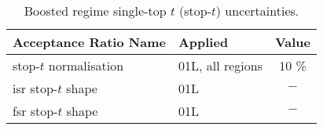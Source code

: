 \begin{table}[!htpb] 
    \begin{center}     
    \begin{tabular}{ l | l | c  } 
    \hline \hline
    \textbf{Acceptance Ratio Name} & \textbf{Applied} & \textbf{Value} \\
    \hline 
    stop-$t$ normalisation & 01L, all regions & 10 \% \\ 
    \hline
    \gls{isr} stop-$t$ shape & 01L & $-$ \\
    \gls{fsr} stop-$t$ shape & 01L & $-$ \\
    \hline
    \hline
    \end{tabular}
    \caption{Boosted regime single-top $t$ (stop-$t$) uncertainties.}
    \label{tab:stopt_summary_boosted}
    \end{center}
\end{table}
